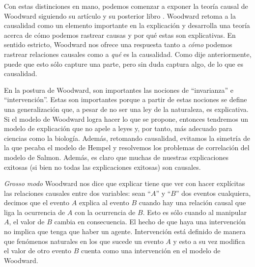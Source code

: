 
Con estas distinciones en mano, podemos comenzar a exponer la teoría causal de Woodward siguiendo su artículo \citeyear{Woodward2000} y su posterior libro \citeyear{Woodward2003}.  Woodward  retoma a la causalidad como un elemento importante en la explicación y desarrolla una teoría acerca de cómo podemos rastrear causas y por qué estas son explicativas. En sentido estricto, Woodward nos ofrece una respuesta tanto a \textit{cómo} podemos rastrear relaciones causales como a \textit{qué} es la causalidad. Como dije anteriormente, puede que esto sólo capture una parte, pero sin duda captura algo, de lo que es causalidad.

En la postura de Woodward, son importantes las nociones de ``invarianza'' e ``intervención''. Estas son importantes porque a partir de estas nociones se define una generalización que, a pesar de no ser una ley de la naturaleza, es explicativa. Si el modelo de Woodward logra hacer lo que se propone, entonces tendremos un modelo de explicación que no apele a leyes y, por tanto, más adecuado para ciencias como la biología. Además, retomando causalidad, evitamos la simetría de la que pecaba el modelo de Hempel y resolvemos los problemas de correlación del modelo de Salmon. Además, es claro que muchas de nuestras explicaciones exitosas (si bien no todas las explicaciones exitosas) son causales.

\textit{Grosso modo} Woodward nos dice que explicar tiene que ver con hacer explícitas las relaciones causales entre dos variables: sean ``$A$'' y ``$B$'' dos eventos cualquiera, decimos que el evento $A$ explica al evento $B$ cuando hay una relación causal que liga la ocurrencia de $A$ con la ocurrencia de $B$. Esto es sólo cuando al manipular $A$, el valor de $B$ cambia en consecuencia. El hecho de que haya una intervención no implica que tenga que haber un agente. Intervención está definido de manera que fenómenos naturales en los que sucede un evento $A$ y esto a su vez modifica el valor de otro evento $B$ cuenta como una intervención en el modelo de Woodward.

